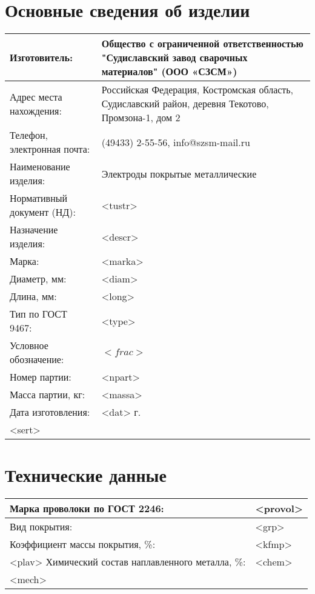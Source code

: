 \documentclass[russian,utf8,pointsection,nocolumnxxxi,nocolumnxxxii,12pt]{eskdtext}
\begin{document}
\maketitle

\tableofcontents
\pagebreak[4]

\section{ Основные сведения об изделии }

\begin{longtable}{|p{5cm}|p{10cm}|}
\hline 
Изготовитель: & Общество с ограниченной ответственностью "Судиславский завод сварочных материалов" (ООО «СЗСМ»)  \\
\hline 
Адрес места нахождения: & Российская Федерация, Костромская область, Судиславский район, деревня Текотово, Промзона-1, дом 2  \\
\hline 
Телефон, электронная почта: & (49433) 2-55-56, info@szsm-mail.ru \\
\hline 
Наименование изделия: & Электроды покрытые металлические \\
\hline 
Нормативный документ (НД): & <tustr> \\
\hline 
Назначение изделия:  & <descr> \\
\hline 
Марка: & <marka> \\
\hline 
Диаметр, мм: & <diam> \\
\hline 
Длина, мм: & <long> \\
\hline 
Тип по ГОСТ 9467: & <type> \\
\hline 
Условное обозначение: & \vspace{-2.5mm}  $ <frac> $ \vspace{2.5mm}\\
\hline 
Номер партии: & <npart> \\
\hline 
Масса партии, кг: & <massa> \\
\hline 
Дата изготовления: & <dat> г. \\
\hline 
<sert>
\end{longtable}

\section{Технические данные}

\begin{longtable}{|p{5cm}|p{10cm}|}
\hline 
Марка проволоки по ГОСТ 2246: & <provol>  \\
\hline 
Вид покрытия: & <grp>  \\
\hline 
Коэффициент массы покрытия, \%: & <kfmp> \\
\hline 
<plav>
Химический состав наплавленного металла, \%: &  
\vspace{-2.5mm} 
<chem>
\vspace{2.5mm} 
\\
\hline 
<mech>
\end{longtable}
\end{document}
